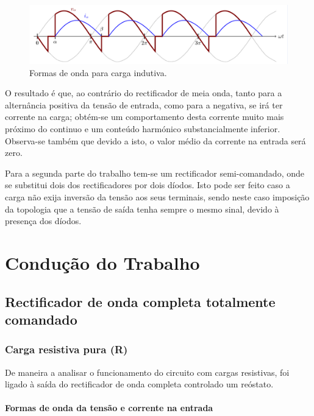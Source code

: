 \documentclass[a4paper,11pt]{article}
\numberwithin{equation}{section}
\begin{document}
\begin{figure}[h]
	\centering
	\includegraphics[keepaspectratio=true, scale=0.8]{img/andamento}
	\caption{Formas de onda para carga indutiva.}
	\label{fig:andamento}
	\vspace{-0.8em}
\end{figure}

O resultado é que, ao contrário do rectificador de meia onda, tanto para a alternância positiva da tensão de entrada, como para a negativa, se irá ter corrente na carga; obtém-se um comportamento desta corrente muito mais próximo do continuo e um conteúdo harmónico substancialmente inferior. Observa-se também que devido a isto, o valor médio da corrente na entrada será zero.

Para a segunda parte do trabalho tem-se um rectificador semi-comandado, onde se substitui dois dos rectificadores por dois díodos. Isto pode ser feito caso a carga não exija inversão da tensão aos seus terminais, sendo neste caso imposição da topologia que a tensão de saída tenha sempre o mesmo sinal, devido à presença dos díodos.


\section{Condução do Trabalho}

\subsection{Rectificador de onda completa totalmente comandado}


\subsubsection{Carga resistiva pura (R)}

De maneira a analisar o funcionamento do circuito com cargas resistivas, foi ligado à saída do rectificador de onda completa controlado um reóstato.


\paragraph{Formas de onda da tensão e corrente na entrada} \mbox{}\
\end{document}
